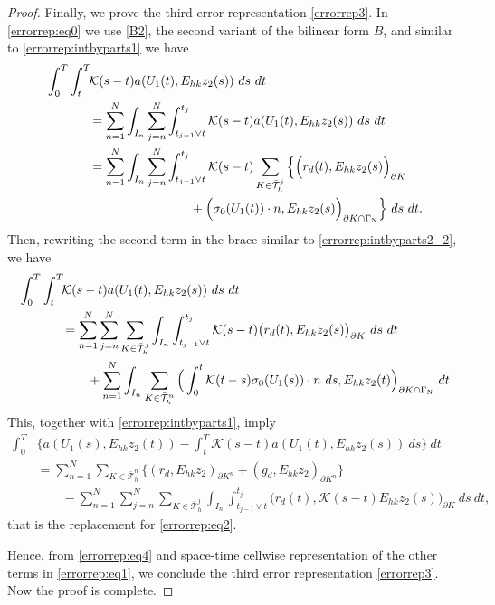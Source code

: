 \documentclass{amsart}
\numberwithin{equation}{section}
\theoremstyle{definition}
\begin{document}
\begin{proof}
Finally, we prove the third error representation \eqref{errorrep3}.  
In \eqref{errorrep:eq0} we use \eqref{B2}, the second variant of 
the bilinear form $B$, and similar to \eqref{errorrep:intbyparts1} we have
\begin{equation}   \label{errorrep:intbyparts3}
  \begin{split}
    \int_0^T\int_t^T\! &{\mathcal K}(s-t)a(U_1(t),E_{hk}z_2(s))\ ds\ dt\\
    &=\sum_{n=1}^N\int_{I_n}\sum_{j=n}^N\int_{t_{j-1}\vee t}^{t_j}
       {\mathcal K}(s-t)a(U_1(t),E_{hk}z_2(s))\ ds \ dt\\
    &=\sum_{n=1}^N\int_{I_n}\sum_{j=n}^N\int_{t_{j-1}\vee t}^{t_j}
       {\mathcal K}(s-t)\sum_{K\in \bar{\mathcal T}_h^j}
       \Big\{
       \Big(r_d(t),E_{hk}z_2(s) \Big)_{\partial K}\\
    &\qquad\qquad\qquad \qquad
       + \Big(\sigma_0(U_1(t))\cdot n,
       E_{hk}z_2(s)\Big)_{\partial K  \cap \Gamma_{\text N}}
       \Big\}\ ds \ dt.
  \end{split}
\end{equation}
Then, rewriting the second term in the brace 
similar to \eqref{errorrep:intbyparts2_2}, we have
\begin{equation*}   
  \begin{split}
      \int_0^T\int_t^T\! &{\mathcal K}(s-t)a(U_1(t),E_{hk}z_2(s))\ ds\ dt\\
    &=\sum_{n=1}^N\sum_{j=n}^N\sum_{K\in \bar{\mathcal T}_h^j}
       \int_{I_n}\int_{t_{j-1}\vee t}^{t_j}
       {\mathcal K}(s-t)
       \big(r_d(t),E_{hk}z_2(s)\big)_{\partial K}\ ds\ dt\\
    &\qquad 
       +\sum_{n=1}^N\int_{I_n}\sum_{K\in \bar{\mathcal T}_h^n}
        \Big(\int_0^t {\mathcal K}(t-s)\sigma_0(U_1(s))\cdot n\ ds,
       E_{hk}z_2(t)\Big)_{\partial K \cap \Gamma_{\text N}} \ dt
  \end{split}
\end{equation*}
This, together with \eqref{errorrep:intbyparts1}, imply
\begin{equation}   \label{errorrep:eq4}
  \begin{split}
    \int_0^T\! 
    &\Big\{a(U_1(s),E_{hk}z_2(t)) 
       -\int_t^T\! {\mathcal K}(s-t)a(U_1(t),E_{hk}z_2(s))\ ds
       \Big\}\ dt\\
    &=\sum_{n=1}^N \sum_{K\in\bar{\mathcal T}_h^n}
      \Big\{(r_d,E_{hk}z_2)_{\partial K^n} 
       + (g_d,E_{hk}z_2)_{\partial K^n}\Big\}\\
    &\qquad 
     -\sum_{n=1}^N\sum_{j=n}^N\sum_{K\in \bar{\mathcal T}_h^j}
       \int_{I_n}\int_{t_{j-1}\vee t}^{t_j}
       \Big(r_d(t),{\mathcal K}(s-t)E_{hk}z_2(s)\Big)_{\partial K}\ ds\ dt,
  \end{split}
\end{equation}
that is the replacement for \eqref{errorrep:eq2}. 

Hence, from \eqref{errorrep:eq4} and space-time cellwise
representation of the other terms in \eqref{errorrep:eq1}, 
we conclude the third error representation
\eqref{errorrep3}. 
Now the proof is complete. 
\end{proof}
\end{document}
